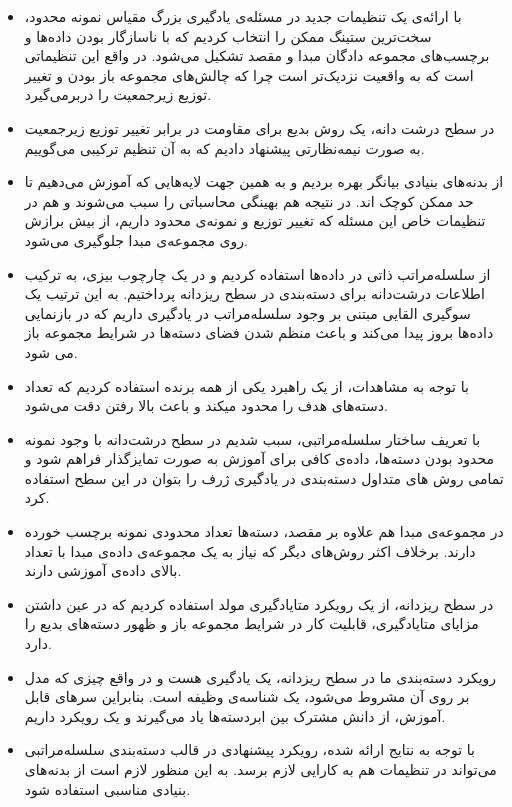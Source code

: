 \begin{itemize}
	\item 
	با ارائه‌ی یک تنظیمات جدید در مسئله‌ی یادگیری بزرگ مقیاس نمونه محدود، سخت‌ترین ستینگ ممکن را انتخاب کردیم که با ناسازگار بودن داده‌ها و برچسب‌های مجموعه دادگان مبدا و مقصد تشکیل می‌شود. در واقع این تنظیماتی است که به واقعیت نزدیک‌تر است چرا که چالش‌های مجموعه باز بودن و تغییر توزیع زیرجمعیت را دربرمی‌گیرد.
	
	\item 
	در سطح درشت دانه، یک روش بدیع برای مقاومت در برابر تغییر توزیع زیرجمعیت به صورت نیمه‌نظارتی پیشنهاد دادیم که به آن تنظیم ترکیبی می‌گوییم.
	
	\item 
	
	از بدنه‌های بنیادی بیانگر بهره بردیم و به همین جهت لایه‌هایی که آموزش می‌دهیم تا حد ممکن کوچک اند. در نتیجه هم بهینگی محاسباتی را سبب می‌شوند و هم در تنظیمات خاص این مسئله که تغییر توزیع و نمونه‌ی محدود داریم، از بیش برازش روی مجموعه‌ی مبدا جلوگیری می‌شود.
	
	\item 
	از سلسله‌مراتب ذاتی در داده‌‌ها استفاده کردیم و در یک چارچوب بیزی، به ترکیب اطلاعات درشت‌دانه برای دسته‌بندی در سطح ریزدانه پرداختیم. به این ترتیب یک سوگیری القایی مبتنی بر وجود سلسله‌مراتب در یادگیری داریم که در بازنمایی داده‌ها بروز پیدا می‌کند و باعث منظم شدن فضای دسته‌ها در شرایط مجموعه باز می ‌شود.
	
	\item 
با توجه به مشاهدات، از یک راهبرد یکی از همه برنده استفاده کردیم که تعداد دسته‌های هدف را محدود میکند و باعث بالا رفتن دقت می‌شود.
	
	\item 
با تعریف ساختار سلسله‌مراتبی، سبب شدیم در سطح درشت‌دانه با وجود نمونه محدود بودن دسته‌ها، داده‌ی کافی برای آموزش به صورت تمایزگذار فراهم شود و تمامی روش های متداول دسته‌بندی در یادگیری ژرف را بتوان در این سطح استفاده کرد.

	\item
در مجموعه‌ی مبدا هم علاوه بر مقصد، دسته‌ها تعداد محدودی نمونه برچسب خورده دارند. برخلاف اکثر روش‌های دیگر که نیاز به یک مجموعه‌ی داده‌ی مبدا با تعداد بالای داده‌ی آموزشی دارند.
	
	\item 
در سطح ریزدانه، از یک رویکرد متایادگیری مولد استفاده کردیم که در عین داشتن مزایای متایادگیری، قابلیت کار در شرایط مجموعه باز و ظهور دسته‌های بدیع را دارد.
	
	\item 
رویکرد دسته‌بندی ما در سطح ریزدانه، یک یادگیری
 هست و در واقع چیزی که مدل بر روی آن مشروط می‌شود، یک شناسه‌ی وظیفه است. بنابراین سر‌های قابل آموزش، از دانش مشترک بین ابردسته‌ها یاد می‌گیرند و  یک رویکرد 
داریم.
	
	\item 
	با توجه به نتایج ارائه شده، رویکرد پیشنهادی در قالب دسته‌بندی سلسله‌مراتبی می‌تواند در تنظیمات
	 هم به کارایی لازم برسد. به این منظور لازم است از بدنه‌های بنیادی مناسبی استفاده شود.
	
\end{itemize}

